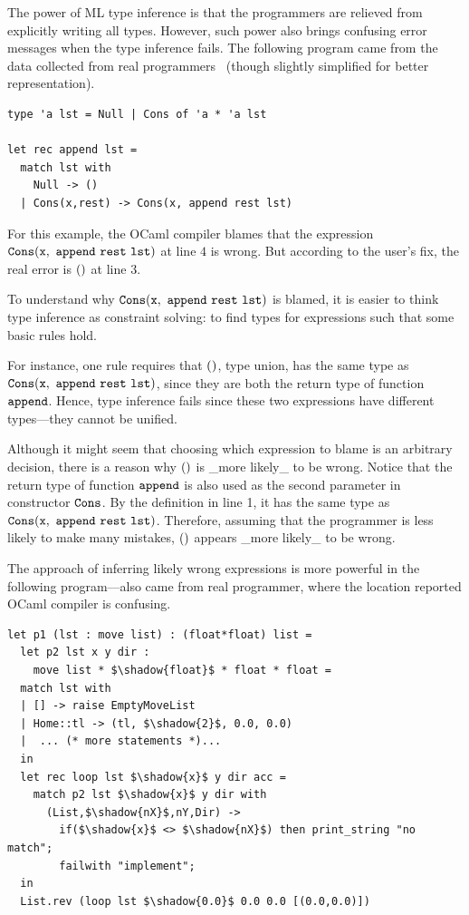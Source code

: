 The power of ML type inference is that the programmers are relieved
from explicitly writing all types. However, such power also brings
confusing error messages when the type inference fails. The following
program came from the data collected from real
programmers~\cite{lerner:pldi07} (though slightly simplified for
better representation).

\lstset{numbers=left, xleftmargin=15pt, framexleftmargin=15pt}
\begin{lstlisting}
type 'a lst = Null | Cons of 'a * 'a lst

let rec append lst =
  match lst with
    Null -> ()
  | Cons(x,rest) -> Cons(x, append rest lst)
\end{lstlisting}

For this example, the OCaml compiler blames that the expression
$\cod{Cons(x,\ append\ rest\ lst)}$ at line $4$ is wrong. But
according to the user's fix, the real error is $\mathtt{()}$ at line $3$.

To understand why $\cod{Cons(x,\ append\ rest\ lst)}$ is blamed, it
is easier to think type inference as constraint solving: to find types
for expressions such that some basic rules hold.

For instance, one rule requires that $\mathtt{(})$, type union, has the
same type as $\cod{Cons(x,\ append\ rest\ lst)}$, since they are both
the return type of function $\mathtt{append}$. Hence, type inference
fails since these two expressions have different types---they cannot
be unified.

Although it might seem that choosing which expression to blame is an arbitrary
decision, there is a reason why $\mathtt{(})$ is _more likely_ to be wrong.
Notice that the return type of function $\mathtt{append}$ is also
used as the second parameter in constructor $\mathtt{Cons}$.  By the
definition in line 1, it has the same type as $\mathtt{Cons(x,\ append\
rest\ lst)}$.
Therefore, assuming that the programmer is less likely to make many
mistakes, $\mathtt{(})$ appears _more likely_ to be wrong.

The approach of inferring likely wrong expressions is more powerful in
the following program---also came from real programmer, where the
location reported OCaml compiler is confusing.

\begin{lstlisting}
let p1 (lst : move list) : (float*float) list = 
  let p2 lst x y dir : 
    move list * $\shadow{float}$ * float * float = 
  match lst with
  | [] -> raise EmptyMoveList
  | Home::tl -> (tl, $\shadow{2}$, 0.0, 0.0)
  |  ... (* more statements *)... 
  in
  let rec loop lst $\shadow{x}$ y dir acc =
    match p2 lst $\shadow{x}$ y dir with
      (List,$\shadow{nX}$,nY,Dir) -> 
        if($\shadow{x}$ <> $\shadow{nX}$) then print_string "no match";
        failwith "implement";
  in 
  List.rev (loop lst $\shadow{0.0}$ 0.0 0.0 [(0.0,0.0)])
\end{lstlisting}

